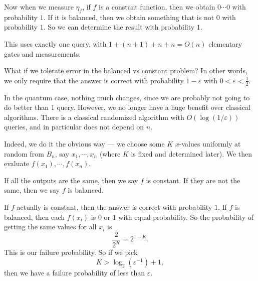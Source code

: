 Now when we measure $\eta_f$, if $f$ is a constant function, then we obtain $0\cdots0$ with probability $1$. If it is balanced, then we obtain something that is not $0$ with probability $1$. So we can determine the result with probability $1$.
\begin{center}
\end{center}
This uses exactly one query, with $1 + (n + 1) + n + n = O(n)$ elementary gates and measurements.

What if we tolerate error in the balanced vs constant problem? In other words, we only require that the answer is correct with probability $1 - \varepsilon$ with $0 < \varepsilon < \frac{1}{2}$.

In the quantum case, nothing much changes, since we are probably not going to do better than $1$ query. However, we no longer have a huge benefit over classical algorithms. There is a classical randomized algorithm with $O(\log(1/\varepsilon))$ queries, and in particular does not depend on $n$.

Indeed, we do it the obvious way --- we choose some $K$ $x$-values uniformly at random from $B_n$, say $x_1, \cdots, x_n$ (where $K$ is fixed and determined later). We then evaluate $f(x_1), \cdots, f(x_n)$.

If all the outputs are the same, then we say $f$ is constant. If they are not the same, then we say $f$ is balanced.

If $f$ actually is constant, then the answer is correct with probability $1$. If $f$ is balanced, then each $f(x_i)$ is $0$ or $1$ with equal probability. So the probability of getting the same values for all $x_i$ is
\[
  \frac{2}{2^K} = 2^{1 - K}.
\]
This is our failure probability. So if we pick
\[
  K > \log_2 (\varepsilon^{-1}) + 1,
\]
then we have a failure probability of less than $\varepsilon$.

